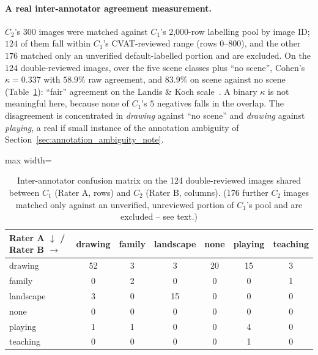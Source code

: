 \documentclass[12pt,a4paper]{report}
\begin{document}
\paragraph{A real inter-annotator agreement measurement.} $C_2$'s 300 images were matched against $C_1$'s 2,000-row labelling pool by image ID; $124$ of them fall within $C_1$'s CVAT-reviewed range (rows $0$--$800$), and the other $176$ matched only an unverified default-labelled portion and are excluded. On the $124$ double-reviewed images, over the five scene classes plus ``no scene'', Cohen's~\cite{cohen1960kappa} $\kappa = 0.337$ with $58.9\%$ raw agreement, and $83.9\%$ on scene against no scene (Table~\ref{tab:iaa_confusion}): ``fair'' agreement on the Landis \& Koch scale~\cite{landis1977}. A binary $\kappa$ is not meaningful here, because none of $C_1$'s $5$ negatives falls in the overlap. The disagreement is concentrated in \textit{drawing} against ``no scene'' and \textit{drawing} against \textit{playing}, a real if small instance of the annotation ambiguity of Section~\ref{sec:annotation_ambiguity_note}.

\begin{table}[!htbp]
\centering
\caption[Two raters' scene labels on 124 pictures]{Inter-annotator confusion matrix on the 124 double-reviewed images shared between $C_1$ (Rater A, rows) and $C_2$ (Rater B, columns). (176 further $C_2$ images matched only against an unverified, unreviewed portion of $C_1$'s pool and are excluded -- see text.)}
\label{tab:iaa_confusion}
\begin{adjustbox}{max width=\linewidth}
\begin{tabular}{lcccccc}
\toprule
\textbf{Rater A $\downarrow$ / Rater B $\rightarrow$} & \textbf{drawing} & \textbf{family} & \textbf{landscape} & \textbf{none} & \textbf{playing} & \textbf{teaching} \\
\midrule
drawing & 52 & 3 & 3 & 20 & 15 & 3 \\
family & 0 & 2 & 0 & 0 & 0 & 1 \\
landscape & 3 & 0 & 15 & 0 & 0 & 0 \\
none & 0 & 0 & 0 & 0 & 0 & 0 \\
playing & 1 & 1 & 0 & 0 & 4 & 0 \\
teaching & 0 & 0 & 0 & 0 & 1 & 0 \\
\bottomrule
\end{tabular}
\end{adjustbox}
\end{table}
\end{document}
